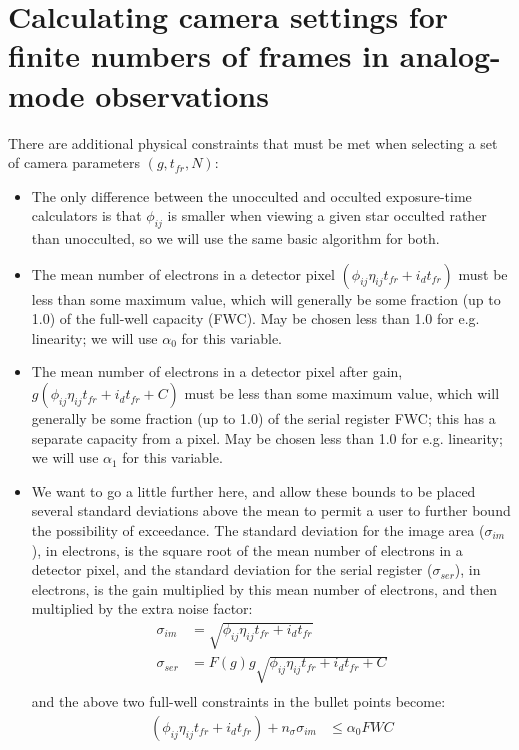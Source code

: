 \documentclass{article}
\begin{document}
\section{Calculating camera settings for finite numbers of frames in analog-mode observations}

There are additional physical constraints that must be met when selecting a set of camera parameters $(g, t_{fr}, N)$:
\begin{itemize}
\item The only difference between the unocculted and occulted exposure-time calculators is that $\phi_{ij}$ is smaller when viewing a given star occulted rather than unocculted, so we will use the same basic algorithm for both.
\item The mean number of electrons in a detector pixel $(\phi_{ij} \eta_{ij} t_{fr} + i_{d} t_{fr})$ must be less than some maximum value, which will generally be some fraction (up to 1.0) of the full-well capacity (FWC).  May be chosen less than 1.0 for e.g. linearity; we will use $\alpha_0$ for this variable.
\item The mean number of electrons in a detector pixel after gain, $g (\phi_{ij} \eta_{ij} t_{fr} + i_{d} t_{fr} + C)$ must be less than some maximum value, which will generally be some fraction (up to 1.0) of the serial register FWC; this has a separate capacity from a pixel.  May be chosen less than 1.0 for e.g. linearity; we will use $\alpha_1$ for this variable.
\item We want to go a little further here, and allow these bounds to be placed several standard deviations above the mean to permit a user to further bound the possibility of exceedance.  The standard deviation for the image area ($\sigma_{im}$), in electrons, is the square root of the mean number of electrons in a detector pixel, and the standard deviation for the serial register ($\sigma_{ser}$), in electrons, is the gain multiplied by this mean number of electrons, and then multiplied by the extra noise factor:
\begin{align}
\sigma_{im} &= \sqrt{\phi_{ij} \eta_{ij} t_{fr} + i_{d} t_{fr}} \\
\sigma_{ser} &= F(g) g \sqrt{\phi_{ij} \eta_{ij} t_{fr} + i_{d} t_{fr} + C} \\
\end{align}
and the above two full-well constraints in the bullet points become:
\begin{align}
(\phi_{ij} \eta_{ij} t_{fr} + i_{d} t_{fr}) + n_{\sigma} \sigma_{im} &\leq \alpha_{0} FWC \\

\end{align}
\end{itemize}
\end{document}
